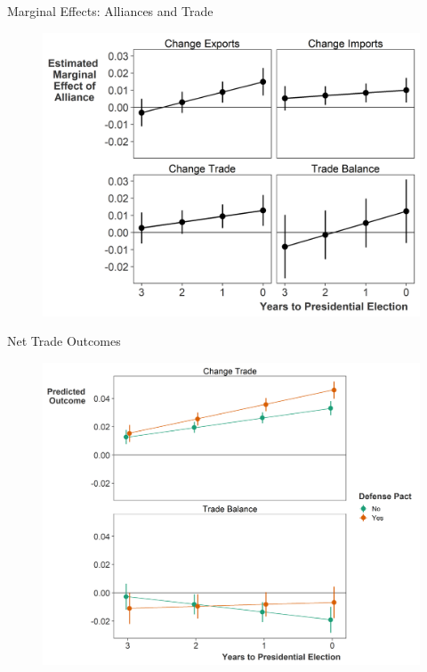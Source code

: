 \documentclass[12pt]{beamer}
\begin{document}
\begin{frame}{Marginal Effects: Alliances and Trade}

\begin{figure}[htbp]
	\centering
		\includegraphics[height=.90\textheight]{us-defense-me.png}
\end{figure}


\end{frame}



\begin{frame}{Net Trade Outcomes}

\begin{figure}[htbp]
	\centering
		\includegraphics[height=.90\textheight]{us-elec-pred-net.png}
\end{figure}


\end{frame}
\end{document}
